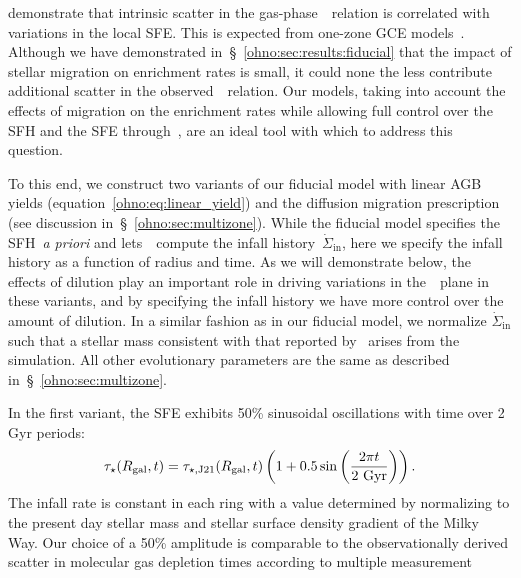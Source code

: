 \citet{Schaefer2020} demonstrate that intrinsic scatter in the
gas-phase~\ohno~relation is correlated with variations in the local SFE.
This is expected from one-zone GCE models~\citep[e.g.][]{Molla2006,
Vincenzo2016a}.
Although we have demonstrated in~\S~\ref{ohno:sec:results:fiducial} that the impact
of stellar migration on enrichment rates is small, it could none the less
contribute additional scatter in the observed~\ohno~relation.
Our models, taking into account the effects of migration on the
enrichment rates while allowing full control over the SFH and the SFE
through~\vice, are an ideal tool with which to address this question.
\par
To this end, we construct two variants of our fiducial model
with linear AGB yields (equation~\ref{ohno:eq:linear_yield}) and the
diffusion migration prescription (see discussion in~\S~\ref{ohno:sec:multizone}).
While the fiducial model specifies the SFH~\textit{a priori} and
lets~\vice~compute the infall history~$\dot{\Sigma}_\text{in}$, here we specify
the infall history as a function of radius and time.
As we will demonstrate below, the effects of dilution play an important role in
driving variations in the~\ohno~plane in these variants, and by specifying the
infall history we have more control over the amount of dilution.
In a similar fashion as in our fiducial model, we normalize
$\dot{\Sigma}_\text{in}$ such that a stellar mass consistent with that reported
by~\citet{Licquia2015} arises from the simulation.
All other evolutionary parameters are the same as described
in~\S~\ref{ohno:sec:multizone}.
\par
In the first variant, the SFE exhibits 50\% sinusoidal oscillations with time
over 2 Gyr periods:
\begin{equation}
\tau_\star(R_\text{gal}, t) = \tau_{\star,\text{J21}}(R_\text{gal}, t)
\left(1 + 0.5\sin\left(\frac{2\pi t}{2~\text{Gyr}}\right)\right).
\label{ohno:eq:sfe_var}
\end{equation}
The infall rate is constant in each ring with a value determined by normalizing
to the present day stellar mass and stellar surface density gradient of the
Milky Way.
Our choice of a 50\% amplitude is comparable to the observationally derived
scatter in molecular gas depletion times according to multiple measurement
